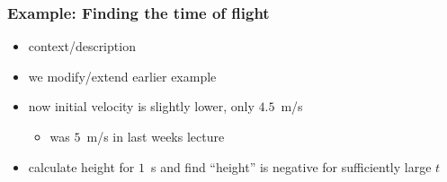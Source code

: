 \documentclass[english,14pt]{beamer}
\begin{document}
%
%
%
%


\begin{frame}[fragile]

\frametitle{Example: Finding the time of flight}

\begin{itemize}
	\item context/description
	\item we modify/extend earlier example
	\item now initial velocity is slightly lower, only $4.5$~m/s
	\begin{itemize}
		\item was $5$~m/s in last weeks lecture
	\end{itemize}
	\item calculate height for $1$~s and find ``height'' is negative for sufficiently large $t$ %
\end{itemize}


\end{frame}

\end{document}
